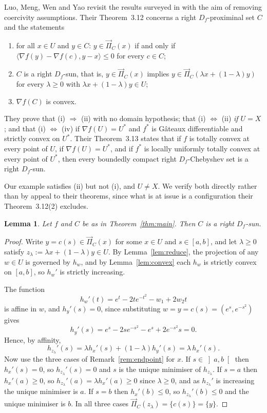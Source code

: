 \documentclass[11pt]{amsart}
\theoremstyle{plain}
\newtheorem{lemma}[theorem]{Lemma}
\theoremstyle{definition}
\theoremstyle{remark}
\newcommand{\D}{D_f}
\newcommand{\Proj}{\overrightarrow{\Pi}}
\newcommand{\ip}[2]{\langle #1, #2 \rangle}
\begin{document}
Luo, Meng, Wen and Yao \cite{LMWY2019} revisit the results surveyed in
\cite{BMW2010} with the aim of removing coercivity assumptions. Their
Theorem~3.12 concerns a right $\D$-proximinal set $C$ and the statements
\begin{enumerate}[label=\textup{(\roman*)},leftmargin=2.2em]
  \item for all $x \in U$ and $y \in C$: $y \in \Proj_{C}(x)$ if and only if
        $\ip{\nabla f(y) - \nabla f(c)}{y - x} \le 0$ for every $c \in C$;
  \item $C$ is a right $\D$-sun, that is, $y \in \Proj_{C}(x)$ implies
        $y \in \Proj_{C}(\lambda x + (1-\lambda) y)$ for every $\lambda \ge 0$
        with $\lambda x + (1-\lambda) y \in U$;
  \setcounter{enumi}{3}
  \item $\nabla f(C)$ is convex.
\end{enumerate}
They prove that (i) $\Rightarrow$ (ii) with no domain hypothesis; that
(i) $\Leftrightarrow$ (ii) \emph{if $U = X$}; and that (i) $\Leftrightarrow$ (iv)
if $\nabla f(U) = U^{*}$ and $f^{*}$ is G\^ateaux differentiable and strictly
convex on $U^{*}$. Their Theorem~3.13 states that if $f$ is totally convex at
every point of $U$, if $\nabla f(U) = U^{*}$, and if $f^{*}$ is locally uniformly
totally convex at every point of $U^{*}$, then every boundedly compact right
$\D$-Chebyshev set is a right $\D$-sun.

Our example satisfies (ii) but not (i), and $U \neq X$. We verify both directly
rather than by appeal to their theorems, since what is at issue is a
configuration their Theorem~3.12(2) excludes.

\begin{lemma}\label{lem:sun}
Let $f$ and $C$ be as in Theorem~\textup{\ref{thm:main}}. Then $C$ is a right
$\D$-sun.
\end{lemma}

\begin{proof}
Write $y = c(s) \in \Proj_{C}(x)$ for some $x \in U$ and $s \in [a,b]$, and let
$\lambda \ge 0$ satisfy $z_{\lambda} := \lambda x + (1-\lambda) y \in U$. By
Lemma~\ref{lem:reduce}, the projection of any $w \in U$ is governed by $h_{w}$,
and by Lemma~\ref{lem:convex} each $h_{w}$ is strictly convex on $[a,b]$, so
$h_{w}'$ is strictly increasing.

The function
\[
  h_{w}'(t) = e^{t} - 2t e^{-t^{2}} - w_{1} + 2 w_{2} t
\]
is affine in $w$, and $h_{y}'(s) = 0$, since substituting
$w = y = c(s) = (e^{s}, e^{-s^{2}})$ gives
\[
  h_{y}'(s) = e^{s} - 2s e^{-s^{2}} - e^{s} + 2 e^{-s^{2}} s = 0 .
\]
Hence, by affinity,
\[
  h_{z_{\lambda}}'(s)
  = \lambda h_{x}'(s) + (1-\lambda) h_{y}'(s)
  = \lambda\, h_{x}'(s).
\]
Now use the three cases of Remark~\ref{rem:endpoint} for $x$. If
$s \in \left]a,b\right[$ then $h_{x}'(s) = 0$, so $h_{z_{\lambda}}'(s) = 0$ and
$s$ is the unique minimiser of $h_{z_{\lambda}}$. If $s = a$ then
$h_{x}'(a) \ge 0$, so $h_{z_{\lambda}}'(a) = \lambda h_{x}'(a) \ge 0$ since
$\lambda \ge 0$, and as $h_{z_{\lambda}}'$ is increasing the unique minimiser is
$a$. If $s = b$ then $h_{x}'(b) \le 0$, so $h_{z_{\lambda}}'(b) \le 0$ and the
unique minimiser is $b$. In all three cases
$\Proj_{C}(z_{\lambda}) = \{c(s)\} = \{y\}$.
\end{proof}
\end{document}
